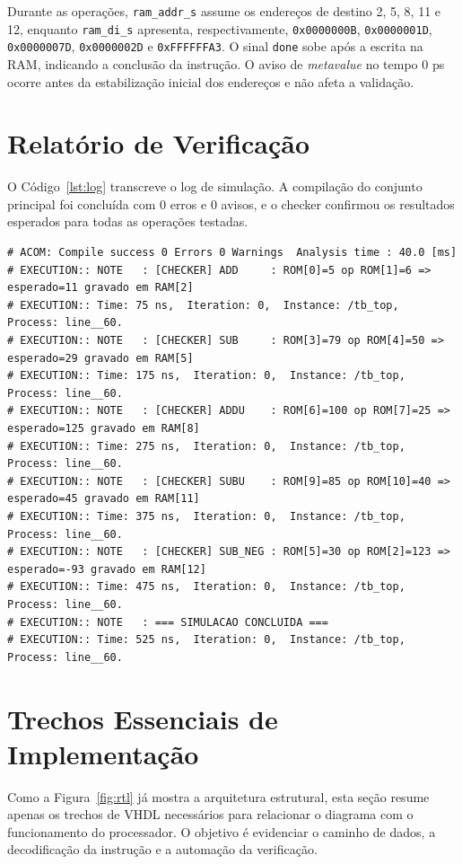 \documentclass[conference]{IEEEtran}
\begin{document}
Durante as operações, \texttt{ram\_addr\_s} assume os endereços de destino 2, 5, 8, 11 e 12, enquanto \texttt{ram\_di\_s} apresenta, respectivamente, \texttt{0x0000000B}, \texttt{0x0000001D}, \texttt{0x0000007D}, \texttt{0x0000002D} e \texttt{0xFFFFFFA3}. O sinal \texttt{done} sobe após a escrita na RAM, indicando a conclusão da instrução. O aviso de \textit{metavalue} no tempo 0 ps ocorre antes da estabilização inicial dos endereços e não afeta a validação.

\section{Relatório de Verificação}
O Código~\ref{lst:log} transcreve o log de simulação. A compilação do conjunto principal foi concluída com 0 erros e 0 avisos, e o checker confirmou os resultados esperados para todas as operações testadas.

\begin{lstlisting}[caption={Log de verificação emitido pelo simulador},label={lst:log}]
# ACOM: Compile success 0 Errors 0 Warnings  Analysis time : 40.0 [ms]
# EXECUTION:: NOTE   : [CHECKER] ADD     : ROM[0]=5 op ROM[1]=6 => esperado=11 gravado em RAM[2]
# EXECUTION:: Time: 75 ns,  Iteration: 0,  Instance: /tb_top,  Process: line__60.
# EXECUTION:: NOTE   : [CHECKER] SUB     : ROM[3]=79 op ROM[4]=50 => esperado=29 gravado em RAM[5]
# EXECUTION:: Time: 175 ns,  Iteration: 0,  Instance: /tb_top,  Process: line__60.
# EXECUTION:: NOTE   : [CHECKER] ADDU    : ROM[6]=100 op ROM[7]=25 => esperado=125 gravado em RAM[8]
# EXECUTION:: Time: 275 ns,  Iteration: 0,  Instance: /tb_top,  Process: line__60.
# EXECUTION:: NOTE   : [CHECKER] SUBU    : ROM[9]=85 op ROM[10]=40 => esperado=45 gravado em RAM[11]
# EXECUTION:: Time: 375 ns,  Iteration: 0,  Instance: /tb_top,  Process: line__60.
# EXECUTION:: NOTE   : [CHECKER] SUB_NEG : ROM[5]=30 op ROM[2]=123 => esperado=-93 gravado em RAM[12]
# EXECUTION:: Time: 475 ns,  Iteration: 0,  Instance: /tb_top,  Process: line__60.
# EXECUTION:: NOTE   : === SIMULACAO CONCLUIDA ===
# EXECUTION:: Time: 525 ns,  Iteration: 0,  Instance: /tb_top,  Process: line__60.
\end{lstlisting}



\section{Trechos Essenciais de Implementação}
Como a Figura~\ref{fig:rtl} já mostra a arquitetura estrutural, esta seção resume apenas os trechos de VHDL necessários para relacionar o diagrama com o funcionamento do processador. O objetivo é evidenciar o caminho de dados, a decodificação da instrução e a automação da verificação.
\end{document}
